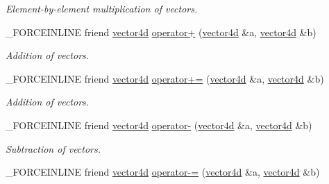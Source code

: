\begin{DoxyCompactItemize}
\begin{DoxyCompactList}\small\item\em Element-\/by-\/element multiplication of vectors. \end{DoxyCompactList}\item 
\hypertarget{classbt_1_1vector4d_a291e6e1da7a93a1739550d96680295e8}{\-\_\-\-F\-O\-R\-C\-E\-I\-N\-L\-I\-N\-E friend \hyperlink{classbt_1_1vector4d}{vector4d} \hyperlink{classbt_1_1vector4d_a291e6e1da7a93a1739550d96680295e8}{operator+} (\hyperlink{classbt_1_1vector4d}{vector4d} \&a, \hyperlink{classbt_1_1vector4d}{vector4d} \&b)}\label{classbt_1_1vector4d_a291e6e1da7a93a1739550d96680295e8}

\begin{DoxyCompactList}\small\item\em Addition of vectors. \end{DoxyCompactList}\item 
\hypertarget{classbt_1_1vector4d_a0238000d71d534d509cd406e1299492a}{\-\_\-\-F\-O\-R\-C\-E\-I\-N\-L\-I\-N\-E friend \hyperlink{classbt_1_1vector4d}{vector4d} \hyperlink{classbt_1_1vector4d_a0238000d71d534d509cd406e1299492a}{operator+=} (\hyperlink{classbt_1_1vector4d}{vector4d} \&a, \hyperlink{classbt_1_1vector4d}{vector4d} \&b)}\label{classbt_1_1vector4d_a0238000d71d534d509cd406e1299492a}

\begin{DoxyCompactList}\small\item\em Addition of vectors. \end{DoxyCompactList}\item 
\hypertarget{classbt_1_1vector4d_a6f3d3f4d9b9239b30257895eaa69b587}{\-\_\-\-F\-O\-R\-C\-E\-I\-N\-L\-I\-N\-E friend \hyperlink{classbt_1_1vector4d}{vector4d} \hyperlink{classbt_1_1vector4d_a6f3d3f4d9b9239b30257895eaa69b587}{operator-\/} (\hyperlink{classbt_1_1vector4d}{vector4d} \&a, \hyperlink{classbt_1_1vector4d}{vector4d} \&b)}\label{classbt_1_1vector4d_a6f3d3f4d9b9239b30257895eaa69b587}

\begin{DoxyCompactList}\small\item\em Subtraction of vectors. \end{DoxyCompactList}\item 
\hypertarget{classbt_1_1vector4d_aec668fdc4ebc4e654254840ef2f3f9bf}{\-\_\-\-F\-O\-R\-C\-E\-I\-N\-L\-I\-N\-E friend \hyperlink{classbt_1_1vector4d}{vector4d} \hyperlink{classbt_1_1vector4d_aec668fdc4ebc4e654254840ef2f3f9bf}{operator-\/=} (\hyperlink{classbt_1_1vector4d}{vector4d} \&a, \hyperlink{classbt_1_1vector4d}{vector4d} \&b)}\label{classbt_1_1vector4d_aec668fdc4ebc4e654254840ef2f3f9bf}


\end{DoxyCompactItemize}
